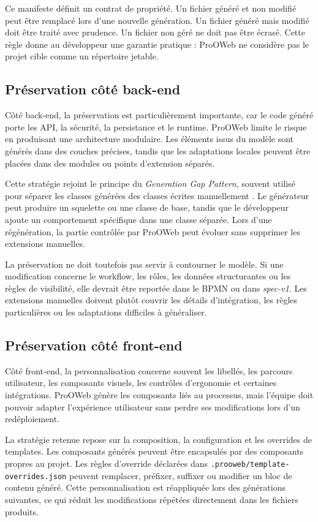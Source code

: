Ce manifeste définit un contrat de propriété. Un fichier généré et non modifié peut être remplacé lors d'une nouvelle génération. Un fichier généré mais modifié doit être traité avec prudence. Un fichier non géré ne doit pas être écrasé. Cette règle donne au développeur une garantie pratique : ProOWeb ne considère pas le projet cible comme un répertoire jetable.

\subsection{Préservation côté back-end}

Côté back-end, la préservation est particulièrement importante, car le code généré porte les API, la sécurité, la persistance et le runtime. ProOWeb limite le risque en produisant une architecture modulaire. Les éléments issus du modèle sont générés dans des couches précises, tandis que les adaptations locales peuvent être placées dans des modules ou points d'extension séparés.

Cette stratégie rejoint le principe du \textit{Generation Gap Pattern}, souvent utilisé pour séparer les classes générées des classes écrites manuellement \cite{greifenberg2015}. Le générateur peut produire un squelette ou une classe de base, tandis que le développeur ajoute un comportement spécifique dans une classe séparée. Lors d'une régénération, la partie contrôlée par ProOWeb peut évoluer sans supprimer les extensions manuelles.

La préservation ne doit toutefois pas servir à contourner le modèle. Si une modification concerne le workflow, les rôles, les données structurantes ou les règles de visibilité, elle devrait être reportée dans le BPMN ou dans \textit{spec-v1}. Les extensions manuelles doivent plutôt couvrir les détails d'intégration, les règles particulières ou les adaptations difficiles à généraliser.

\subsection{Préservation côté front-end}

Côté front-end, la personnalisation concerne souvent les libellés, les parcours utilisateur, les composants visuels, les contrôles d'ergonomie et certaines intégrations. ProOWeb génère les composants liés au processus, mais l'équipe doit pouvoir adapter l'expérience utilisateur sans perdre ses modifications lors d'un redéploiement.

La stratégie retenue repose sur la composition, la configuration et les overrides de templates. Les composants générés peuvent être encapsulés par des composants propres au projet. Les règles d'override déclarées dans \texttt{.prooweb/template-overrides.json} peuvent remplacer, préfixer, suffixer ou modifier un bloc de contenu généré. Cette personnalisation est réappliquée lors des générations suivantes, ce qui réduit les modifications répétées directement dans les fichiers produits.

